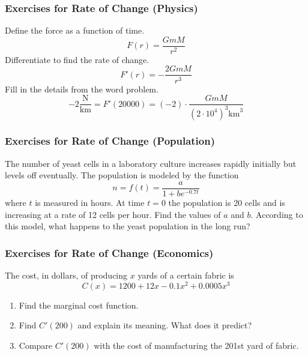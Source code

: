 \documentclass[xcolor=dvipsnames]{beamer}
\begin{document}
\begin{frame}
  \frametitle{Exercises for Rate of Change (Physics)}
  Define the force as a function of time.
  \begin{equation}
    \label{eq:ohseesie}
    F(r)=\frac{GmM}{r^{2}}
  \end{equation}
  Differentiate to find the rate of change.
  \begin{equation}
    \label{eq:eiphaila}
    F'(r)=-\frac{2GmM}{r^{3}}
  \end{equation}
  Fill in the details from the word problem.
  \begin{equation}
    \label{eq:luzielee}
    -2\frac{\mbox{N}}{\mbox{km}}=F'(20000)=(-2)\cdot\frac{GmM}{\left(2\cdot{}10^{4}\right)^{3}\mbox{km}^{3}}
  \end{equation}
\end{frame}

\begin{frame}
  \frametitle{Exercises for Rate of Change (Population)}
The number of yeast cells in a laboratory culture increases rapidly
initially but levels off eventually. The population is modeled by the
function
\begin{equation}
  \label{eq:kupeivae}
  n=f(t)=\frac{a}{1+be^{-0.7t}}
\end{equation}
where $t$ is measured in hours. At time $t=0$ the population is 20
cells and is increasing at a rate of 12 cells per hour. Find the
values of $a$ and $b$. According to this model, what happens to the
yeast population in the long run?
\end{frame}

\begin{frame}
  \frametitle{Exercises for Rate of Change (Economics)}
The cost, in dollars, of producing $x$ yards of a certain fabric is
\begin{equation}
  \label{eq:uquuthae}
  C(x)=1200+12x-0.1x^{2}+0.0005x^{3}
\end{equation}
\begin{enumerate}
\item<1-> Find the marginal cost function.
\item<2-> Find $C'(200)$ and explain its meaning. What does it
  predict?
\item<3-> Compare $C'(200)$ with the cost of manufacturing the 201st
  yard of fabric.
\end{enumerate}
\end{frame}
\end{document}
